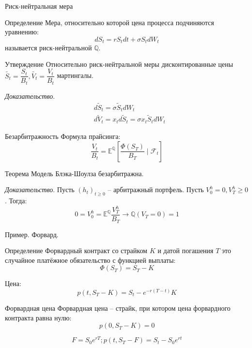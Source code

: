 \documentclass[aspectratio=169]{beamer}
\begin{document}
\begin{frame}{Риск-нейтральная мера}
    \begin{block}{Определение}
        Мера, относительно которой цена процесса подчиняются уравнению:
        $$
            dS_t = r S_t dt + \sigma S_t dW_t
        $$ называется риск-нейтральной $\mathbb{Q}$.
    \end{block}
    \pause
    \begin{block}{Утверждение}
        Относительно риск-нейтральной меры дисконтированные цены $\widetilde{S_t} = \dfrac{S_t}{B_t}, \widetilde{V_t} = \dfrac{V_t}{B_t}$ мартингалы.
    \end{block}
    \pause
    \textit{Доказательство}. 
    \begin{align*}
        &d \widetilde S_t = \sigma \widetilde S_t dW_t \\
        &d \widetilde V_t = x_t d \widetilde S_t = \sigma x_t \widetilde S_t dW_t 
    \end{align*}
\end{frame}

\begin{frame}{Безарбитражность}
    Формула прайсинга:
    $$
        \dfrac{V_t}{B_t} = \mathbb{E}^{\mathbb{Q}}
        \left[ \dfrac{\Phi(S_T)}{B_T} \mid \mathcal{F}_t\right]
    $$

    \pause 

    \begin{block}{Теорема}
        Модель Блэка-Шоулза безарбитражна. 
    \end{block}
    \textit{Доказательство}. Пусть $(h_t)_{t\geq 0}$ -- арбитражный портфель. Пусть $V_0^h = 0, V_T^h \geq 0$. Тогда:
    $$
        0 = V_0^h = \mathbb{E}^{\mathbb{Q}} \dfrac{V_T^h}{B_T} \to \mathbb{Q}(V_T = 0) = 1
    $$
\end{frame}

\begin{frame}{Пример. Форвард.}
    \begin{block}{Определение}
        Форвардный контракт со страйком $K$ и датой погашения $T$ это случайное платёжное обязательство с функцией выплаты:
        $$
            \Phi(S_T) = S_T - K
        $$
    \end{block}
    
    \pause

    Цена:
    $$
        p(t, S_T - K) = S_t - e^{-r(T-t)} K
    $$

    \pause

    \begin{block}{Форвардная цена}
        Форвардная цена -- страйк, при котором цена форвардного контракта равна нулю:
        $$
            p(0, S_T - K) = 0
        $$
    \end{block}
    $$F = S_0 e^{rT}; p(t, S_T - F) = S_t - S_0 e^{rt}$$    
\end{frame}
\end{document}
